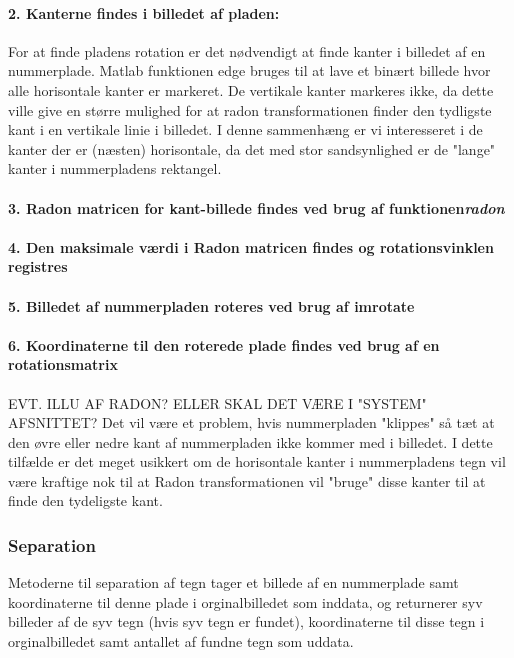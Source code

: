 \paragraph{2. Kanterne findes i billedet af pladen:}
For at finde pladens rotation er det nødvendigt at finde kanter i billedet af en nummerplade. Matlab funktionen edge bruges til at lave et binært billede hvor alle horisontale kanter er markeret. De vertikale kanter markeres ikke, da dette ville give en større mulighed for at radon transformationen finder den tydligste kant i en vertikale linie i billedet. I denne sammenhæng er vi interesseret i de kanter der er (næsten) horisontale, da det med stor sandsynlighed er de "lange" kanter i nummerpladens rektangel.

\paragraph{3. Radon matricen for kant-billede findes ved brug af funktionen\textit{radon}}

\paragraph{4. Den maksimale værdi i Radon matricen findes og rotationsvinklen registres}
\paragraph{5. Billedet af nummerpladen roteres ved brug af imrotate}
\paragraph{6. Koordinaterne til den roterede plade findes ved brug af en rotationsmatrix}
EVT. ILLU AF RADON? ELLER SKAL DET VÆRE I "SYSTEM" AFSNITTET?
Det vil være et problem, hvis nummerpladen "klippes" så tæt at den øvre eller nedre kant af nummerpladen ikke kommer med i billedet. I dette tilfælde er det meget usikkert om de horisontale kanter i nummerpladens tegn vil være kraftige nok til at Radon transformationen vil "bruge" disse kanter til at finde den tydeligste kant.

\subsubsection{Separation}

Metoderne til separation af tegn tager et billede af en nummerplade samt koordinaterne til denne plade i orginalbilledet som inddata, og returnerer syv billeder af de syv tegn (hvis syv tegn er fundet), koordinaterne til disse tegn i orginalbilledet samt antallet af fundne tegn som uddata.

